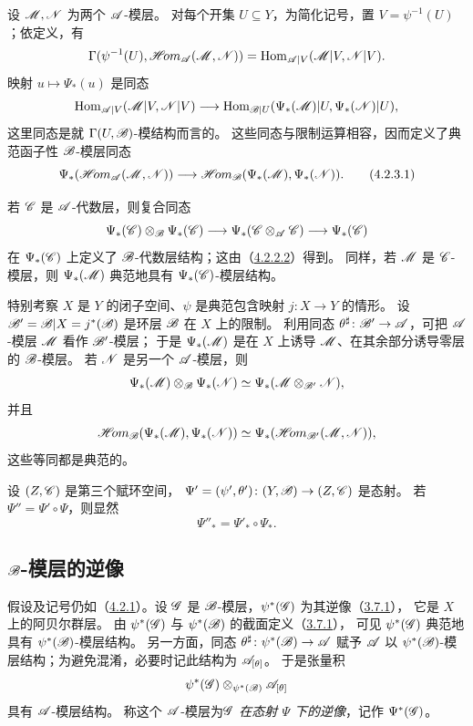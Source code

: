设 $\mathscr M,\mathscr N$ 为两个 $\mathscr A$-模层。
对每个开集 $U\subseteq Y$，为简化记号，置 $V=\psi^{-1}(U)$；依定义，有
\[
 \Gamma(\psi^{-1}(U),\mathscr{H}\!om_{\mathscr A}(\mathscr M,\mathscr N))
 =\operatorname{Hom}_{\mathscr A|V}(\mathscr M|V,\mathscr N|V).
\]
映射 $u\mapsto\Psi_*(u)$ 是同态
\[
 \operatorname{Hom}_{\mathscr A|V}(\mathscr M|V,\mathscr N|V)
 \longrightarrow
 \operatorname{Hom}_{\mathscr B|U}(\Psi_*(\mathscr M)|U,\Psi_*(\mathscr N)|U),
\]
这里同态是就 $\Gamma(U,\mathscr B)$-模结构而言的。
这些同态与限制运算相容，因而定义了典范函子性 $\mathscr B$-模层同态
\begin{equation}
 \Psi_*(\mathscr{H}\!om_{\mathscr A}(\mathscr M,\mathscr N))
 \longrightarrow\mathscr{H}\!om_{\mathscr B}(\Psi_*(\mathscr M),\Psi_*(\mathscr N)).
 \tag{4.2.3.1}\label{eq:0:4.2.3.1}
\end{equation}

若 $\mathscr C$ 是 $\mathscr A$-代数层，则复合同态
\[
 \Psi_*(\mathscr C)\otimes_{\mathscr B}\Psi_*(\mathscr C)
 \longrightarrow\Psi_*(\mathscr C\otimes_{\mathscr A}\mathscr C)
 \longrightarrow\Psi_*(\mathscr C)
\]
在 $\Psi_*(\mathscr C)$ 上定义了 $\mathscr B$-代数层结构；这由（\hyperref[eq:0:4.2.2.2]{4.2.2.2}）得到。
同样，若 $\mathscr M$ 是 $\mathscr C$-模层，则 $\Psi_*(\mathscr M)$ 典范地具有 $\Psi_*(\mathscr C)$-模层结构。

特别考察 $X$ 是 $Y$ 的闭子空间、$\psi$ 是典范包含映射 $j\colon X\to Y$ 的情形。
设 $\mathscr B'=\mathscr B|X=j^*(\mathscr B)$ 是环层 $\mathscr B$ 在 $X$ 上的限制。
利用同态 $\theta^\sharp\colon\mathscr B'\to\mathscr A$，可把 $\mathscr A$-模层 $\mathscr M$ 看作 $\mathscr B'$-模层；
于是 $\Psi_*(\mathscr M)$ 是在 $X$ 上诱导 $\mathscr M$、在其余部分诱导零层的 $\mathscr B$-模层。
若 $\mathscr N$ 是另一个 $\mathscr A$-模层，则
\[
 \Psi_*(\mathscr M)\otimes_{\mathscr B}\Psi_*(\mathscr N)
 \simeq\Psi_*(\mathscr M\otimes_{\mathscr B'}\mathscr N),
\]
并且
\[
 \mathscr{H}\!om_{\mathscr B}(\Psi_*(\mathscr M),\Psi_*(\mathscr N))
 \simeq\Psi_*(\mathscr{H}\!om_{\mathscr B'}(\mathscr M,\mathscr N)),
\]
这些等同都是典范的。

设 $(Z,\mathscr C)$ 是第三个赋环空间，
$\Psi'=(\psi',\theta')\colon(Y,\mathscr B)\to(Z,\mathscr C)$ 是态射。
若 $\Psi''=\Psi'\circ\Psi$，则显然
\[
 \Psi''_*=\Psi'_*\circ\Psi_*.
\]

\separation
\subsection{\texorpdfstring{$\mathscr B$}{B}-模层的逆像}\hypertarget{heading:0:4.3}{}

假设及记号仍如（\hyperlink{para:0:4.2.1}{4.2.1}）。设 $\mathscr G$ 是 $\mathscr B$-模层，$\psi^*(\mathscr G)$ 为其逆像（\hyperlink{para:0:3.7.1}{3.7.1}），
它是 $X$ 上的阿贝尔群层。
由 $\psi^*(\mathscr G)$ 与 $\psi^*(\mathscr B)$ 的截面定义（\hyperlink{para:0:3.7.1}{3.7.1}），
可见 $\psi^*(\mathscr G)$ 典范地具有 $\psi^*(\mathscr B)$-模层结构。
另一方面，同态 $\theta^\sharp\colon\psi^*(\mathscr B)\to\mathscr A$ 赋予 $\mathscr A$ 以
$\psi^*(\mathscr B)$-模层结构；为避免混淆，必要时记此结构为 $\mathscr A_{[\theta]}$。
于是张量积
\[
 \psi^*(\mathscr G)\otimes_{\psi^*(\mathscr B)}\mathscr A_{[\theta]}
\]
具有 $\mathscr A$-模层结构。
称这个 $\mathscr A$-模层为\emph{$\mathscr G$ 在态射 $\Psi$ 下的逆像}，记作 $\Psi^*(\mathscr G)$。

